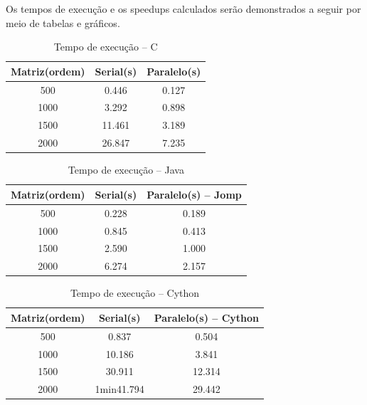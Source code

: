 \documentclass[a4paper,12pt]{article}
\begin{document}
Os tempos de execução e os speedups calculados serão demonstrados a seguir por meio de tabelas e gráficos. 

\begin{table}[H]
  \centering
  \caption{Tempo de execução -- C}
  \begin{tabular}{ccc}
    \hline
    Matriz(ordem) & Serial(s) & Paralelo(s)\\
    \hline
    \hline
    500 & 0.446 & 0.127\\
    1000 & 3.292 & 0.898\\
    1500 & 11.461 & 3.189\\
    2000 & 26.847 & 7.235\\
    \hline
  \end{tabular}
  \label{tab:timec}
\end{table}




\begin{table}[H]
  \centering
  \caption{Tempo de execução -- Java}
  \begin{tabular}{ccc}
    \hline
    Matriz(ordem) & Serial(s) & Paralelo(s) -- Jomp\\
    \hline
    \hline
    500 & 0.228 & 0.189\\
    1000 & 0.845 & 0.413\\
    1500 & 2.590 & 1.000\\
    2000 & 6.274 & 2.157\\
    \hline
  \end{tabular}
  \label{tab:timeJava}
\end{table}



\begin{table}[H]
  \centering
  \caption{Tempo de execução -- Cython}
  \begin{tabular}{ccc}
    \hline
    Matriz(ordem) & Serial(s) & Paralelo(s) -- Cython \\
    \hline
    \hline
    500 & 0.837 &  0.504 \\
    1000 & 10.186 & 3.841\\
    1500 & 30.911 & 12.314\\
    2000 & 1min41.794 & 29.442\\
    \hline
  \end{tabular}
  \label{tab:timePy1}
\end{table}
\end{document}
